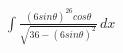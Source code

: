 \documentclass[preview]{standalone}
\begin{document}
\begin{align*}
\int \frac{(6sin\theta)^26cos\theta}{\sqrt{36-(6sin\theta)^2}} \, dx
\end{align*}
\end{document}
